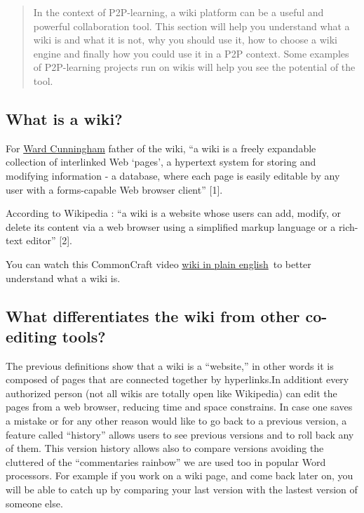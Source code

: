 \begin{quote}
In the context of P2P-learning, a wiki platform can be a useful and
powerful collaboration tool. This section will help you understand what
a wiki is and what it is not, why you should use it, how to choose a
wiki engine and finally how you could use it in a P2P context. Some
examples of P2P-learning projects run on wikis will help you see the
potential of the tool.
\end{quote}

\subsection{What is a wiki?}\label{what-is-a-wiki}

For \href{http://en.wikipedia.org/wiki/Ward_cunningham}{Ward Cunningham}
father of the wiki, ``a wiki is a freely expandable collection of
interlinked Web `pages', a hypertext system for storing and modifying
information - a database, where each page is easily editable by any user
with a forms-capable Web browser client'' {{[}1{]}}.

According to Wikipedia : ``a wiki is a website whose users can add,
modify, or delete its content via a web browser using a simplified
markup language or a rich-text editor'' {{[}2{]}}.

You can watch this CommonCraft video
\href{http://www.youtube.com/watch?v=-dnL00TdmLY}{wiki in plain
english}~to better understand what a wiki is.

\subsection{What differentiates the wiki from other co-editing
tools?}\label{what-differentiates-the-wiki-from-other-co-editing-tools}

The previous definitions show that a wiki is a ``website,'' in other
words it is composed of pages that are connected together by
hyperlinks.In additiont every authorized person (not all wikis are
totally open like Wikipedia) can edit the pages from a web browser,
reducing time and space constrains. In case one saves a mistake or for
any other reason would like to go back to a previous version, a feature
called ``history'' allows users to see previous versions and to roll
back any of them. This version history allows also to compare versions
avoiding the cluttered of the ``commentaries rainbow'' we are used too
in popular Word processors. For example if you work on a wiki page, and
come back later on, you will be able to catch up by comparing your last
version with the lastest version of someone else.

